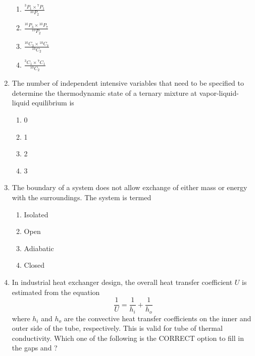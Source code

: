 \documentclass[journal,12pt,onecolumn]{IEEEtran}
\theoremstyle{remark}
\begin{document}
\begin{enumerate}
		\hfill{}
		
		\begin{enumerate}
			\item $\frac{{}^{3}P_{1}\times{}^{7}P_{1}}{{}^{10}P_{2}}$
			\item $\frac{{}^{10}P_{3}\times{}^{10}P_{7}}{{}^{10}P_{2}}$
			\item $\frac{{}^{10}C_{3}\times{}^{10}C_{7}}{{}^{10}C_{2}}$
			\item $\frac{{}^{3}C_{1}\times{}^{7}C_{1}}{{}^{10}C_{2}}$
		\end{enumerate}
		
		\item The number of independent intensive variables that need to be specified to determine the thermodynamic state of a ternary mixture at vapor-liquid-liquid equilibrium is
		
		\hfill{}
		
		\begin{multicols}{4}
			\begin{enumerate}
				\item 0
				\item 1
				\item 2
				\item 3
			\end{enumerate}
		\end{multicols}
		
		\item The boundary of a system does not allow exchange of either mass or energy  with the surroundings. The system is termed
		
		\hfill{}
		
		\begin{multicols}{2}
			\begin{enumerate}
				\item Isolated
				\item Open
				\item Adiabatic
				\item Closed
			\end{enumerate}
		\end{multicols}
		
		\item In industrial heat exchanger design, the overall heat transfer coefficient $U$ is estimated from the equation
		\[ \frac{1}{U} = \frac{1}{h_i} + \frac{1}{h_o} \]
		where $h_i$ and $h_o$ are the convective heat transfer coefficients on the inner and outer side of the tube, respectively. This is valid for  \underline{\hspace{2cm}} tube of  \underline{\hspace{2cm}} thermal conductivity.
		Which one of the following is the CORRECT option to fill in the gaps  and ?
		

\end{enumerate}
\end{document}
